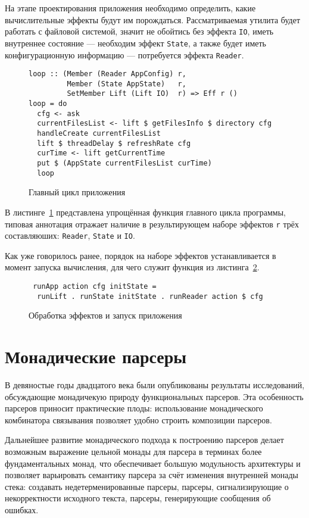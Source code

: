 На этапе проектирования приложения необходимо определить, какие вычислительные эффекты будут им порождаться. Рассматриваемая утилита будет работать с файловой системой, значит не обойтись без эффекта \lstinline{IO}, иметь внутреннее состояние --- необходим эффект \lstinline{State}, а также будет иметь конфигурационную информацию --- потребуется эффекта \lstinline{Reader}.

\begin{figure}[t]
\begin{lstlisting}
loop :: (Member (Reader AppConfig) r,
         Member (State AppState)   r,
         SetMember Lift (Lift IO)  r) => Eff r ()
loop = do
  cfg <- ask
  currentFilesList <- lift $ getFilesInfo $ directory cfg
  handleCreate currentFilesList
  lift $ threadDelay $ refreshRate cfg
  curTime <- lift getCurrentTime
  put $ (AppState currentFilesList curTime)
  loop
\end{lstlisting}
\caption{Главный цикл приложения}
\label{listing:ftMainLoop}
\end{figure}

В листинге~\ref{listing:ftMainLoop} представлена упрощённая функция главного цикла программы, типовая аннотация отражает наличие в результирующем наборе эффектов \lstinline{r} трёх составляюших: \lstinline{Reader}, \lstinline{State} и \lstinline{IO}.

Как уже говорилось ранее, порядок на наборе эффектов устанавливается в момент запуска вычисления, для чего служит функция из листинга~\ref{listing:ftRun}.

\begin{figure}[t]
\begin{lstlisting}
 runApp action cfg initState =
  runLift . runState initState . runReader action $ cfg
\end{lstlisting}
\caption{Обработка эффектов и запуск приложения}
\label{listing:ftRun}
\end{figure}

\section{Монадические парсеры}

В девяностые годы двадцатого века были опубликованы результаты исследований, обсуждающие монадичекую природу функциональных парсеров. Эта особенность парсеров приносит практические плоды: использование монадического комбинатора связывания позволяет удобно строить композиции парсеров.

Дальнейшее развитие монадического подхода к построению парсеров делает возможным выражение цельной монады для парсера в терминах более фундаментальных монад, что обеспечивает большую модульность архитектуры и позволяет варьировать семантику парсера за счёт изменения внутренней монады стека: создавать недетерменированные парсеры, парсеры, сигнализирующие о некорректности исходного текста, парсеры, генерирующие сообщения об ошибках.

